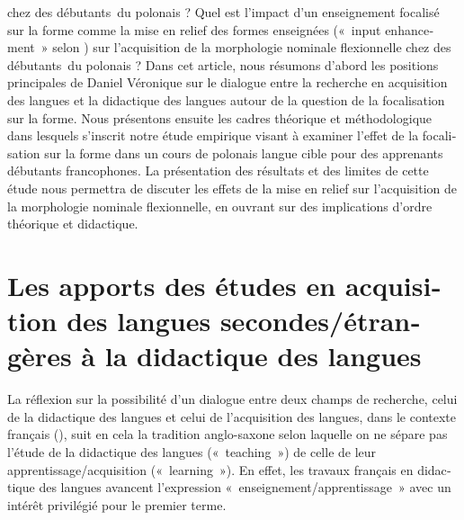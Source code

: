 \documentclass[output=paper]{langscibook}
\begin{document}
\begin{otherlanguage}{french}
chez des débutants~du polonais ? Quel est l’impact d’un enseignement focalisé sur la forme comme la mise en relief des formes enseignées («~input enhancement~» selon \citealt{SharwoodSmith1993}) sur l’acquisition de la morphologie nominale flexionnelle chez des débutants~du polonais ? Dans cet article, nous résumons d’abord les positions principales de Daniel Véronique sur le dialogue entre la recherche en acquisition des langues et la didactique des langues autour de la question de la focalisation sur la forme. Nous présentons ensuite les cadres théorique et méthodologique dans lesquels s’inscrit notre étude empirique visant à examiner l’effet de la focalisation sur la forme dans un cours de polonais langue cible pour des apprenants débutants francophones. La présentation des résultats et des limites de cette étude nous permettra de discuter les effets de la mise en relief sur l’acquisition de la morphologie nominale flexionnelle, en ouvrant sur des implications d’ordre théorique et didactique.


\section{Les apports des études en acquisition des langues secondes/étrangères à la didactique des langues}\label{sec:watorek:1}

La réflexion sur la possibilité d’un dialogue entre deux champs de recherche, celui de la didactique des langues et celui de l’acquisition des langues, dans le contexte français (\citealt{Véronique2000,Véronique2005Interrelations,Véronique2019}), suit en cela la tradition anglo-saxone selon laquelle on ne sépare pas l’étude de la didactique des langues («~teaching~») de celle de leur apprentissage\slash acquisition («~learning~»). En effet, les travaux français en didactique des langues avancent l’expression «~enseignement/apprentissage~» avec un intérêt privilégié pour le premier terme.


\end{otherlanguage}
\end{document}
